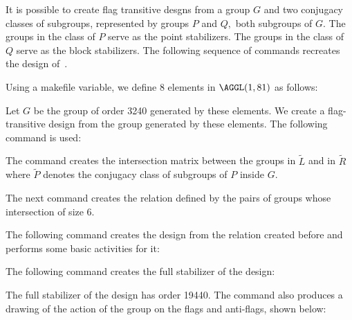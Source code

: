 It is possible to create flag transitive desgns from 
a group $G$ and two conjugacy classes of subgroups, represented by groups $P$ and $Q,$ both subgroups of $G$.
The groups in the class of $P$ serve as the point stabilizers. The groups in the class of $Q$ serve as the block stabilizers. 
The following sequence of commands recreates the design of~\cite{Praeger2007}.
 
Using a makefile variable, we define 8 elements in $\AGGL(1,81)$ as follows:


Let $G$ be the group of order 3240 generated by these elements. 
We create a flag-transitive design from the group generated by these elements. The following command is used:


The command creates the intersection matrix between the groups in $\tilde{L}$ and in $\tilde{R}$ where 
$\tilde{P}$ denotes the conjugacy class of subgroups of $P$ inside $G$.


The next command creates the relation defined 
by the pairs of groups whose intersection of size 6. 



The following command creates the design from the relation created before 
and performs some basic activities for it:


The following command creates the full stabilizer of the design:



The full stabilizer of the design has order 19440.
The command also produces a drawing of the action of the 
group on the flags and anti-flags, shown below:







 